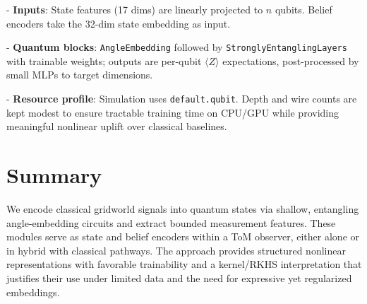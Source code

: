 \documentclass[11pt]{article}
\begin{document}
- \textbf{Inputs}: State features (17 dims) are linearly projected to \(n\) qubits. Belief encoders take the 32-dim state embedding as input.

- \textbf{Quantum blocks}: \texttt{AngleEmbedding} followed by \texttt{StronglyEntanglingLayers} with trainable weights; outputs are per-qubit \(\langle Z\rangle\) expectations, post-processed by small MLPs to target dimensions.

- \textbf{Resource profile}: Simulation uses \texttt{default.qubit}. Depth and wire counts are kept modest to ensure tractable training time on CPU/GPU while providing meaningful nonlinear uplift over classical baselines.

\section{Summary}

We encode classical gridworld signals into quantum states via shallow, entangling angle-embedding circuits and extract bounded measurement features. These modules serve as state and belief encoders within a ToM observer, either alone or in hybrid with classical pathways. The approach provides structured nonlinear representations with favorable trainability and a kernel/RKHS interpretation that justifies their use under limited data and the need for expressive yet regularized embeddings.
\end{document}
